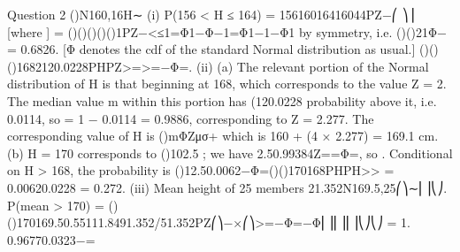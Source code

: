Question 2
()N160,16H∼
(i) P(156 < H ≤ 164) = 15616016416044PZ−⎛ ⎞⎟ [where ]
= ()()()()(){}1PZ−<≤1=Φ1−Φ−1=Φ1−1−Φ1 by symmetry, i.e. ()()21Φ− = 0.6826. [Φ denotes the cdf of the standard Normal distribution as usual.]
()()()1682120.0228PHPZ>=>=−Φ=.
(ii) (a) The relevant portion of the Normal distribution of H is that beginning at 168, which corresponds to the value Z = 2. The median value m within this portion has (120.0228 probability above it, i.e. 0.0114, so = 1 − 0.0114 = 0.9886, corresponding to Z = 2.277. The corresponding value of H is ()mΦZμσ+ which is 160 + (4 × 2.277) = 169.1 cm.
(b) H = 170 corresponds to ()102.5 ; we have 2.50.99384Z==Φ=, so . Conditional on H > 168, the probability is ()12.50.0062−Φ=()()170168PHPH>> = 0.00620.0228 = 0.272.
(iii) Mean height of 25 members 21.352N169.5,25⎛⎞∼⎜⎟⎝⎠.
P(mean > 170) = ()()170169.50.55111.8491.352/51.352PZ⎛⎞−×⎛⎞>=−Φ=−Φ⎜⎟⎜⎟⎜⎟⎝⎠⎝⎠
= 1. 0.96770.0323−=


